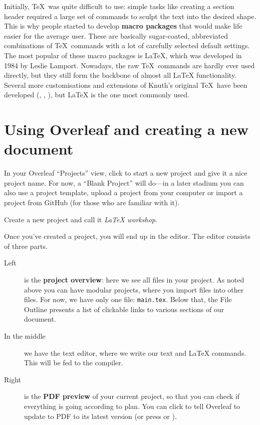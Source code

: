 \documentclass{article}
\newcommand{\definition}[1]{\textbf{#1}}
\newcommand{\filename}[1]{\texttt{#1}}
\newcounter{exercisecounter}
\newcommand{\exercise}[1]{
    \begin{tcolorbox}[colback=blue!5!white,colframe=blue!75!black,title=Exercise \theexercisecounter]
        #1
    \end{tcolorbox}
    \stepcounter{exercisecounter}
}
\begin{document}
Initially, \TeX\ was quite difficult to use: simple tasks like creating a section header required a large set of commands to sculpt the text into the desired shape. This is why people started to develop \definition{macro packages} that would make life easier for the average user. These are basically sugar-coated, abbreviated combinations of \TeX\ commands with a lot of carefully selected default settings. The most popular of these macro packages is \LaTeX, which was developed in 1984 by Leslie Lamport. Nowadays, the raw \TeX\ commands are hardly ever used directly, but they still form the backbone of almost all \LaTeX{} functionality. Several more customisations and extensions of Knuth's original \TeX\ have been developed (, , ), but \LaTeX{} is the one most commonly used.

\section{Using Overleaf and creating a new document}

In your Overleaf ``Projects'' view, click  to start a new project and give it a nice project name. For now, a ``Blank Project'' will do---in a later stadium you can also use a project template, upload a project from your computer or import a project from GitHub (for those who are familiar with it).

\exercise{Create a new project and call it \emph{LaTeX workshop}.}

Once you've created a project, you will end up in the editor. The editor consists of three parts.

\begin{description}
    \item[Left] is the \definition{project overview}: here we see all files in your project. As noted above you can have modular projects, where you import files into other files. For now, we have only one file: \filename{main.tex}. Below that, the File Outline presents a list of clickable links to various sections of our document.
    \item[In the middle] we have the text editor, where we write our text and \LaTeX{} commands. This will be fed to the compiler.
    \item[Right] is the \definition{PDF preview} of your current project, so that you can check if everything is going according to plan. You can click  to tell Overleaf to update to PDF to its latest version (or press  or ).
\end{description}
\end{document}
